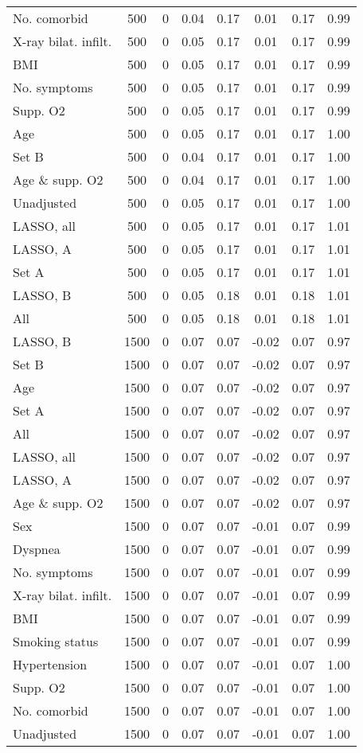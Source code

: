 \documentclass{article}
\begin{document}
\begin{table}[htpb]
{\begin{tabular}{lccccccc}
No. comorbid & 500 & 0 & 0.04 & 0.17 & 0.01 & 0.17 & 0.99\\
X-ray bilat. infilt. & 500 & 0 & 0.05 & 0.17 & 0.01 & 0.17 & 0.99\\
BMI & 500 & 0 & 0.05 & 0.17 & 0.01 & 0.17 & 0.99\\
No. symptoms & 500 & 0 & 0.05 & 0.17 & 0.01 & 0.17 & 0.99\\
Supp. O2 & 500 & 0 & 0.05 & 0.17 & 0.01 & 0.17 & 0.99\\
Age & 500 & 0 & 0.05 & 0.17 & 0.01 & 0.17 & 1.00\\
Set B & 500 & 0 & 0.04 & 0.17 & 0.01 & 0.17 & 1.00\\
Age \& supp. O2 & 500 & 0 & 0.04 & 0.17 & 0.01 & 0.17 & 1.00\\
Unadjusted & 500 & 0 & 0.05 & 0.17 & 0.01 & 0.17 & 1.00\\
LASSO, all & 500 & 0 & 0.05 & 0.17 & 0.01 & 0.17 & 1.01\\
LASSO, A & 500 & 0 & 0.05 & 0.17 & 0.01 & 0.17 & 1.01\\
Set A & 500 & 0 & 0.05 & 0.17 & 0.01 & 0.17 & 1.01\\
LASSO, B & 500 & 0 & 0.05 & 0.18 & 0.01 & 0.18 & 1.01\\
All & 500 & 0 & 0.05 & 0.18 & 0.01 & 0.18 & 1.01\\ \midrule
LASSO, B & 1500 & 0 & 0.07 & 0.07 & -0.02 & 0.07 & 0.97\\
Set B & 1500 & 0 & 0.07 & 0.07 & -0.02 & 0.07 & 0.97\\
Age & 1500 & 0 & 0.07 & 0.07 & -0.02 & 0.07 & 0.97\\
Set A & 1500 & 0 & 0.07 & 0.07 & -0.02 & 0.07 & 0.97\\
All & 1500 & 0 & 0.07 & 0.07 & -0.02 & 0.07 & 0.97\\
LASSO, all & 1500 & 0 & 0.07 & 0.07 & -0.02 & 0.07 & 0.97\\
LASSO, A & 1500 & 0 & 0.07 & 0.07 & -0.02 & 0.07 & 0.97\\
Age \& supp. O2 & 1500 & 0 & 0.07 & 0.07 & -0.02 & 0.07 & 0.97\\
Sex & 1500 & 0 & 0.07 & 0.07 & -0.01 & 0.07 & 0.99\\
Dyspnea & 1500 & 0 & 0.07 & 0.07 & -0.01 & 0.07 & 0.99\\
No. symptoms & 1500 & 0 & 0.07 & 0.07 & -0.01 & 0.07 & 0.99\\
X-ray bilat. infilt. & 1500 & 0 & 0.07 & 0.07 & -0.01 & 0.07 & 0.99\\
BMI & 1500 & 0 & 0.07 & 0.07 & -0.01 & 0.07 & 0.99\\
Smoking status & 1500 & 0 & 0.07 & 0.07 & -0.01 & 0.07 & 0.99\\
Hypertension & 1500 & 0 & 0.07 & 0.07 & -0.01 & 0.07 & 1.00\\
Supp. O2 & 1500 & 0 & 0.07 & 0.07 & -0.01 & 0.07 & 1.00\\
No. comorbid & 1500 & 0 & 0.07 & 0.07 & -0.01 & 0.07 & 1.00\\
Unadjusted & 1500 & 0 & 0.07 & 0.07 & -0.01 & 0.07 & 1.00\\
\bottomrule
\hline
\end{tabular}}
\end{table}
\end{document}
